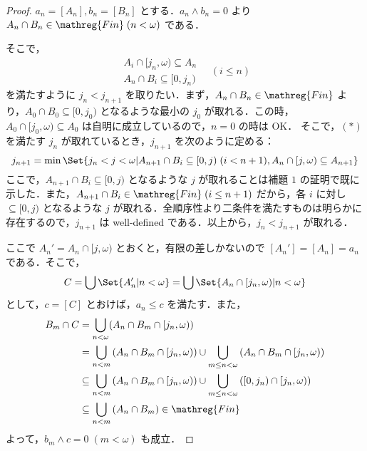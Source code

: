 \documentclass[a4j,xelatex,ja=standard]{bxjsarticle}
\newcommand{\Fin}{\mathreg{Fin}}
\begin{document}
\begin{proof}
 $a_n = [A_n], b_n = [B_n]$ とする．$a_n \wedge b_n = 0$ より $A_n \cap B_n \in \Fin \; (n < \omega)$ である．

 そこで，
\begin{equation*}
  \begin{aligned}
   A_i \cap [j_n, \omega) \subseteq A_n\\
   A_n \cap B_i \subseteq [0, j_n)
  \end{aligned} \quad (i \leq n)\tag{*}
\end{equation*} 
を満たすように $j_n < j_{n+1}$ を取りたい．まず，$A_n \cap B_n \in \Fin$ より，$A_0 \cap B_0 \subseteq [0, j_0)$ となるような最小の $j_0$ が取れる．この時，$A_0 \cap [j_0, \omega) \subseteq A_0$ は自明に成立しているので，$n = 0$ の時は OK．
 そこで，$(*)$ を満たす $j_n$ が取れているとき，$j_{n+1}$ を次のように定める：
 \[
  j_{n+1} = \min \Set{j_n < j < \omega | A_{n+1} \cap B_i \subseteq [0,j) \; (i < n + 1), A_n \cap [j, \omega) \subseteq A_{n+1}}
 \]
 ここで，$A_{n+1} \cap B_i \subseteq [0,j)$ となるような $j$ が取れることは補題 $1$ の証明で既に示した．また，$A_{n+1} \cap B_i \in \Fin\;(i \leq n+1)$ だから，各 $i$ に対し $\subseteq [0, j)$ となるような $j$ が取れる．全順序性より二条件を満たすものは明らかに存在するので，$j_{n+1}$ は well-defined である．以上から，$j_n < j_{n+1}$ が取れる．

 ここで $A_n' = A_n \cap [j, \omega)$ とおくと，有限の差しかないので $[A_n'] = [A_n] = a_n$ である．そこで，
 \[
  C = \bigcup \Set{ A_n' | n < \omega } = \bigcup \Set{A_n \cap [j_n, \omega) | n < \omega}
 \]
 として，$c = [C]$ とおけば，$a_n \leq c$ を満たす．また，
 \begin{align*}
  B_m \cap C &= \bigcup_{n < \omega} (A_n \cap B_m \cap [j_n, \omega))\\
  &= \bigcup_{n < m} \left(A_n \cap B_m \cap [j_n, \omega)\right) \cup \bigcup_{m \leq n < \omega} \left(A_n \cap B_m \cap [j_n, \omega)\right)\\
  &\subseteq \bigcup_{n < m} \left(A_n \cap B_m \cap [j_n, \omega)\right) \cup \bigcup_{m \leq n < \omega} \left([0, j_n) \cap [j_n, \omega)\right)\\
  &\subseteq \bigcup_{n < m} \left(A_n \cap B_m\right) \in \Fin
 \end{align*}
 よって，$b_m \wedge c = 0 \; (m < \omega)$ も成立．\mbox{}
\end{proof}
\end{document}
